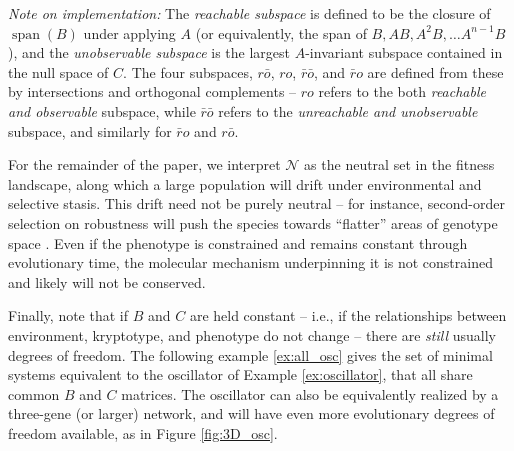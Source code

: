 \documentclass{article}
\newcommand{\ro}{{ro}}
\newcommand{\nro}{{\bar{r}o}}
\newcommand{\rno}{{r\bar{o}}}
\newcommand{\nrno}{{\bar{r}\bar{o}}}
\newcommand{\reachable}{\mathcal{R}}
\newcommand{\unobservable}{\bar{\mathcal{O}}}
\newcommand{\1}{\mathbbm{1}}
\newcommand{\Sys}{\mathcal{S}}
\newcommand{\allS}{\mathcal{N}}
\DeclareMathOperator{\spn}{span}
\begin{document}
\emph{Note on implementation:}
The \emph{reachable subspace}
is defined to be the closure of $\spn(B)$ under applying $A$
(or equivalently, the span of $B, AB, A^2B, \ldots A^{n-1}B$), 
and the \emph{unobservable subspace}
is the largest $A$-invariant subspace
contained in the null space of $C$.
The four subspaces, $\rno$, $\ro$, $\nrno$, and $\nro$
are defined from these by intersections and orthogonal complements --
$\ro$ refers to the both \emph{reachable and observable} subspace,
while $\nrno$ refers to the \emph{unreachable and unobservable} subspace,
and similarly for $\nro$ and $\rno$.


For the remainder of the paper, we interpret $\allS$ as the neutral set in the fitness landscape, 
along which a large population will drift under environmental and selective stasis. 
This drift need not be purely neutral --
for instance, second-order selection on robustness
will push the species towards ``flatter'' areas of genotype space \citep{rice1998evolution,hermisson2003epistasis}.
Even if the phenotype is constrained and remains constant through evolutionary time, 
the molecular mechanism underpinning it is not constrained and likely will not be conserved.

Finally, note that if $B$ and $C$ are held constant --
i.e., if the relationships between environment, kryptotype, and phenotype do not change --
there are \emph{still} usually degrees of freedom. 
The following example \ref{ex:all_osc} gives the set of minimal systems equivalent to the oscillator of Example \ref{ex:oscillator},
that all share common $B$ and $C$ matrices.
The oscillator can also be equivalently realized by a three-gene (or larger) network, and will have even more evolutionary degrees of freedom available, 
as in Figure \ref{fig:3D_osc}.
\end{document}

